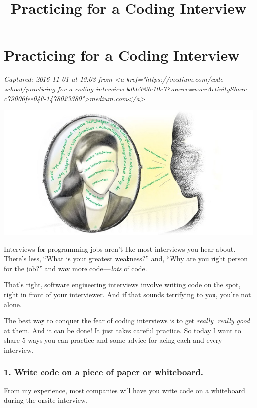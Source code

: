 \documentclass[a4paper,12pt]{article}
\begin{document}
\title{Practicing for a Coding Interview}
\maketitle
\newpage

\section*{Practicing for a Coding Interview}

\emph{Captured: 2016-11-01 at 19:03 from <a href="https://medium.com/code-school/practicing-for-a-coding-interview-bdbb983e10e7?source=userActivityShare-c79006fee040-1478023380">medium.com</a>}

\includegraphics[width=\textwidth]{presentationImg_1.jpeg}

Interviews for programming jobs aren’t like most interviews you hear about.
There’s less, “What is your greatest weakness?” and, “Why are you right person
for the job?” and way more code — \emph{lots} of code.

That’s right, software engineering interviews involve writing code on the
spot, right in front of your interviewer. And if that sounds terrifying to
you, you’re not alone.

The best way to conquer the fear of coding interviews is to get \emph{really,
really good} at them. And it can be done! It just takes careful practice. So
today I want to share 5 ways you can practice and some advice for acing each
and every interview.

\subsubsection*{1. Write code on a piece of paper or whiteboard.}

From my experience, most companies will have you write code on a whiteboard
during the onsite interview.
\end{document}
